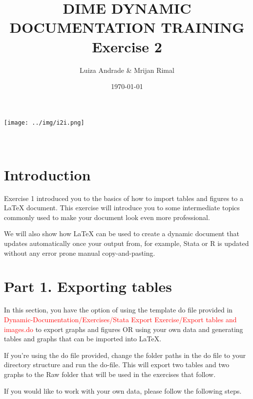 \documentclass[12pts]{report}
\title{DIME DYNAMIC DOCUMENTATION TRAINING \\ Exercise 2}
\author{Luiza Andrade \& Mrijan Rimal}
\date{\today}
\begin{document}
	
	
	\makeatletter
	\begin{titlepage}
		\begin{center}
			\texttt{[image: ../img/i2i.png]}\\[10ex]
			{\LARGE \bfseries  \@title }\\[2ex] 
			{\Large  \@author}\\[20ex] 
			{\large \@date}
		\end{center}
	\end{titlepage}
	\makeatother
	
\section*{Introduction}
Exercise 1 introduced you to the basics of how to import tables and figures to a {\LaTeX} document. This exercise will introduce you to some intermediate topics commonly used to make your document look even more professional.

We will also show how {\LaTeX} can be used to create a dynamic document that updates automatically once your output from, for example, Stata or R is updated without any error prone manual copy-and-pasting.

 

\section*{Part 1. Exporting tables}
In this section, you have the option of using the template do file provided in \textcolor{red}{Dynamic-Documentation/Exercises/Stata Export Exercise/Export tables and images.do} to export graphs and figures OR using your own data and generating tables and graphs that can be imported into {\LaTeX}. 

If you're using the do file provided, change the folder paths in the do file to your directory structure and run the do-file. This will export two tables and two graphs to the Raw folder that will be used in the exercises that follow.  

If you would like to work with your own data, please follow the following steps. 
\end{document}

